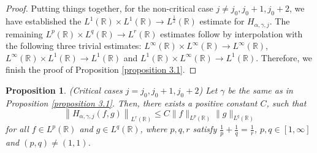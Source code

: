 \documentclass[11pt, twoside, leqno]{article}
\newtheorem{proposition}[theorem]{Proposition}
\theoremstyle{definition}
\numberwithin{equation}{section}
\begin{document}
\begin{proof}
Putting things together, for the non-critical case $j\neq j_0, j_0+1, j_0+2$, we have established the $L^1(\mathbb{R})\times L^1(\mathbb{R}) \rightarrow L^{\frac{1}{2}}(\mathbb{R})$ estimate for $H_{\alpha,\gamma,j}$. The remaining $L^p(\mathbb{R})\times L^q(\mathbb{R}) \rightarrow L^r(\mathbb{R})$ estimates follow by interpolation with the following three trivial estimates: $L^\infty(\mathbb{R})\times L^\infty(\mathbb{R}) \rightarrow L^\infty(\mathbb{R})$, $L^\infty(\mathbb{R})\times L^1(\mathbb{R}) \rightarrow L^1(\mathbb{R})$ and $L^1(\mathbb{R})\times L^\infty(\mathbb{R}) \rightarrow L^1(\mathbb{R})$. Therefore, we finish the proof of Proposition \ref{proposition 3.1}.
\end{proof}

\begin{proposition}\label{proposition 3.2} (Critical cases $j= j_0, j_0+1, j_0+2$) Let $\gamma $ be the same as in Proposition \ref{proposition 3.1}. Then, there exists a positive constant $C$, such that
$$\left\|H_{\alpha,\gamma,j}(f,g)\right\|_{L^{r}(\mathbb{R})}\leq C \|f\|_{L^{p}(\mathbb{R})}\|g\|_{L^{q}(\mathbb{R})}$$
for all $f\in L^{p}(\mathbb{R})$ and $g\in L^{q}(\mathbb{R})$, where $p,q,r$ satisfy $\frac{1}{p}+\frac{1}{q}=\frac{1}{r}$, $p, q \in [1, \infty]$ and $(p,q)\neq (1,1)$.
\end{proposition}
\end{document}
